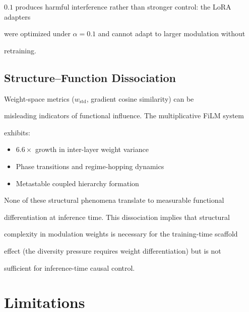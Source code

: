 \documentclass[11pt,a4paper]{article}
\begin{document}
$0.1$ produces harmful interference rather than stronger control: the LoRA adapters

were optimized under $\alpha = 0.1$ and cannot adapt to larger modulation without

retraining.



\subsection{Structure--Function Dissociation}



Weight-space metrics ($w_\mathrm{std}$, gradient cosine similarity) can be

misleading indicators of functional influence. The multiplicative FiLM system

exhibits:

\begin{itemize}

  \item $6.6\times$ growth in inter-layer weight variance

  \item Phase transitions and regime-hopping dynamics

  \item Metastable coupled hierarchy formation

\end{itemize}



None of these structural phenomena translate to measurable functional

differentiation at inference time. This dissociation implies that structural

complexity in modulation weights is necessary for the training-time scaffold

effect (the diversity pressure requires weight differentiation) but is not

sufficient for inference-time causal control.




\section{Limitations}

\end{document}
